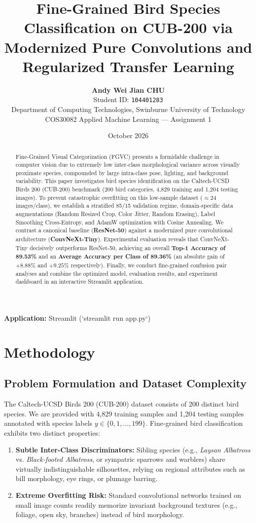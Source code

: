 \documentclass[10pt,twocolumn,letterpaper]{article}
\title{\textbf{Fine-Grained Bird Species Classification on CUB-200 via Modernized Pure Convolutions and Regularized Transfer Learning}}
\author{
    \textbf{Andy Wei Jian CHU} \\
    Student ID: \texttt{104401283} \\
    Department of Computing Technologies, Swinburne University of Technology \\
    COS30082 Applied Machine Learning --- Assignment 1
}
\date{October 2026}
\begin{document}
\maketitle

\begin{abstract}
Fine-Grained Visual Categorization (FGVC) presents a formidable challenge in computer vision due to extremely low inter-class morphological variance across visually proximate species, compounded by large intra-class pose, lighting, and background variability. This paper investigates bird species identification on the Caltech-UCSD Birds 200 (CUB-200) benchmark (200 bird categories, 4,829 training and 1,204 testing images). To prevent catastrophic overfitting on this low-sample dataset ($\approx 24$ images/class), we establish a stratified 85/15 validation regime, domain-specific data augmentations (Random Resized Crop, Color Jitter, Random Erasing), Label Smoothing Cross-Entropy, and AdamW optimization with Cosine Annealing. We contrast a canonical baseline (\textbf{ResNet-50}) against a modernized pure convolutional architecture (\textbf{ConvNeXt-Tiny}). Experimental evaluation reveals that ConvNeXt-Tiny decisively outperforms ResNet-50, achieving an overall \textbf{Top-1 Accuracy of 89.53\%} and an \textbf{Average Accuracy per Class of 89.36\%} (an absolute gain of $+8.88\%$ and $+9.25\%$ respectively). Finally, we conduct fine-grained confusion pair analyses and combine the optimized model, evaluation results, and experiment dashboard in an interactive Streamlit application.
\end{abstract}

\vspace{0.5em}
\noindent\textbf{Application:} Streamlit (`streamlit run app.py`) \\

\section{Methodology}

\subsection{Problem Formulation and Dataset Complexity}
The Caltech-UCSD Birds 200 (CUB-200) dataset consists of 200 distinct bird species. We are provided with 4,829 training samples and 1,204 testing samples annotated with species labels $y \in \{0, 1, \dots, 199\}$. Fine-grained bird classification exhibits two distinct properties:
\begin{enumerate}
    \item \textbf{Subtle Inter-Class Discriminators:} Sibling species (e.g., \textit{Laysan Albatross} vs. \textit{Black-footed Albatross}, or sympatric sparrows and warblers) share virtually indistinguishable silhouettes, relying on regional attributes such as bill morphology, eye rings, or plumage barring.
    \item \textbf{Extreme Overfitting Risk:} Standard convolutional networks trained on small image counts readily memorize invariant background textures (e.g., foliage, open sky, branches) instead of bird morphology.
\end{enumerate}
\end{document}
